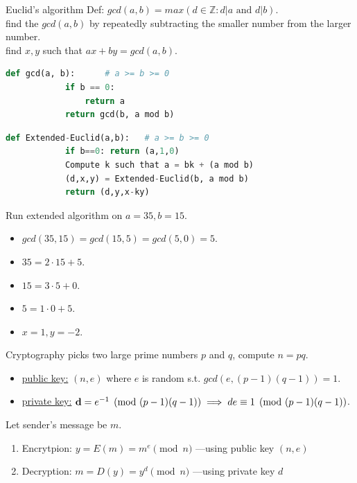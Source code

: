 \documentclass[10pt,a4paper]{article}
\begin{document}
\begin{multicols}{3}
\begin{textbox}{Euclid's algorithm}
    Def: $gcd(a, b) = max(d \in \mathbb{Z} : d | a \text{ and } d | b)$.\\
     find the $gcd(a, b)$ by repeatedly subtracting the smaller number from the larger number.\\
    \linebreak
     find $x, y$ such that $ax + by = gcd(a, b)$.\\
    \begin{lstlisting}[language=Python]
        def gcd(a, b):      # a >= b >= 0
            if b == 0:
                return a
            return gcd(b, a mod b)
    \end{lstlisting}

    \begin{lstlisting}[language=Python]
        def Extended-Euclid(a,b): 	# a >= b >= 0
	        if b==0: return (a,1,0)
            Compute k such that a = bk + (a mod b)
            (d,x,y) = Extended-Euclid(b, a mod b)
            return (d,y,x-ky)

    \end{lstlisting}
     Run extended algorithm on $a = 35, b = 15$.
    \begin{itemize}
        \item $gcd(35, 15) = gcd(15, 5) = gcd(5, 0) = 5$.
        \item $35 = 2 \cdot 15 + 5$.
        \item $15 = 3 \cdot 5 + 0$.
        \item $5 = 1 \cdot 0 + 5$.
        \item $x = 1, y = -2$.
    \end{itemize}
\end{textbox}

\begin{textbox}{Cryptography}
     picks two large prime numbers $p$ and $q$, compute $n = pq$.
    \begin{itemize}
        \item \underline{public key:} $(n, e)$  where $e$ is random s.t. $gcd(e, (p-1)(q-1)) = 1$.
        \item \underline{private key:} ${\bf d} = e^{-1} \pmod{(p-1)(q-1)} \implies de \equiv 1 \pmod{(p-1)(q-1)}$.
    \end{itemize}

     Let sender's message be $m$.
    \begin{enumerate}
        \item Encrytpion: $y = E(m) = m^e \pmod{n}$ —using public key $(n, e)$
        \item Decryption: $m = D(y) = y^{d} \pmod{n}$ —using private key $d$
    \end{enumerate}
\end{textbox}



\end{multicols}
\end{document}
